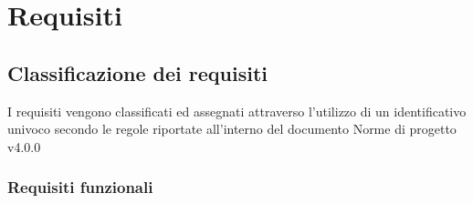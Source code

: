 \clearpage
{}

\section{Requisiti}
\label{sec:requisiti}
\subsection{Classificazione dei requisiti}
\label{sec:classificazione_requisiti}
I requisiti vengono classificati ed assegnati attraverso l'utilizzo di un identificativo univoco secondo le regole riportate all'interno del documento Norme di progetto v4.0.0
\subsubsection{Requisiti funzionali}
